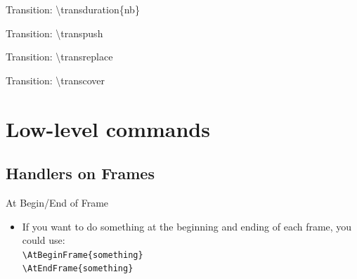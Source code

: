 \documentclass[english,sectioncirclenumberstyle]{ciadbeamer}
\begin{document}
\begin{frame}[c]{Transition: {\textbackslash}transduration\{nb\}}
	\begin{center}
	\end{center}
\end{frame}

\begin{frame}[c]{Transition: {\textbackslash}transpush}
	\transpush
	\begin{center}
	\end{center}
\end{frame}

\begin{frame}[c]{Transition: {\textbackslash}transreplace}
	\transreplace
	\begin{center}
	\end{center}
\end{frame}

\begin{frame}[c]{Transition: {\textbackslash}transcover}
	\transcover
	\begin{center}
	\end{center}
\end{frame}



\section{Low-level commands}
\sectiontableofcontentslide

\subsection{Handlers on Frames}

\begin{frame}{At Begin/End of Frame}
	\begin{itemize}
	\item If you want to do something at the beginning and ending of each frame, you could use: \\
		\texttt{{\textbackslash}AtBeginFrame\{something\}} \\
		\texttt{{\textbackslash}AtEndFrame\{something\}}
	\end{itemize}
\end{frame}
\end{document}
